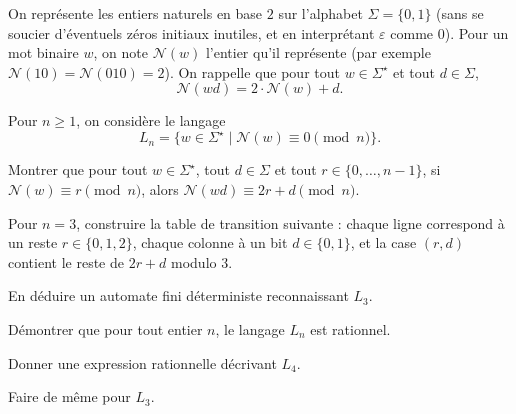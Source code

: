 
\begingroup

\begin{exercice}\label{exo:lexing/automata/challenge}

  On représente les entiers naturels en base $2$ sur l'alphabet $\Sigma = \{0,1\}$
  (sans se soucier d'éventuels zéros initiaux inutiles, et en interprétant $\varepsilon$ comme $0$).
  Pour un mot binaire $w$, on note $\mathcal{N}(w)$ l'entier qu'il représente
  (par exemple $\mathcal{N}(10)=\mathcal{N}(010)=2$).
  On rappelle que pour tout $w \in \Sigma^\star$ et tout $d \in \Sigma$,
  $$
    \mathcal{N}(wd) = 2\cdot \mathcal{N}(w) + d.
  $$

  Pour $n \ge 1$, on considère le langage
  $$
  L_n = \{ w \in \Sigma^\star \mid \mathcal{N}(w) \equiv 0 \pmod{n} \}.
  $$
  
  \begin{questions}
  \item Montrer que pour tout $w \in \Sigma^\star$, tout $d \in \Sigma$ et tout $r \in \{0,\dots,n-1\}$,
    si $\mathcal{N}(w) \equiv r \pmod n$, alors $\mathcal{N}(wd) \equiv 2r + d \pmod n$.

  \item Pour $n=3$, construire la table de transition suivante :
    chaque ligne correspond à un reste $r \in \{0,1,2\}$,
    chaque colonne à un bit $d \in \{0,1\}$,
    et la case $(r,d)$ contient le reste de $2r+d$ modulo $3$.

  \item En déduire un automate fini déterministe reconnaissant $L_3$.

  \item Démontrer que pour tout entier $n$, le langage $L_n$ est rationnel.

  \item Donner une expression rationnelle décrivant $L_4$.

  \item Faire de même pour $L_3$.

  \end{questions}

\end{exercice}

